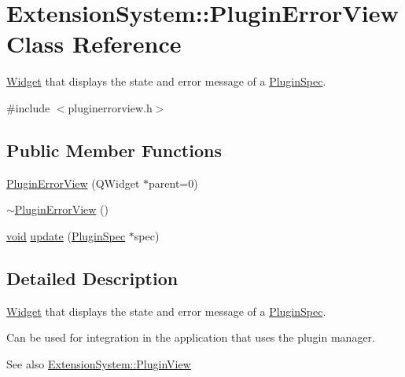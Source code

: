 \hypertarget{class_extension_system_1_1_plugin_error_view}{\section{\-Extension\-System\-:\-:\-Plugin\-Error\-View \-Class \-Reference}
\label{class_extension_system_1_1_plugin_error_view}
}


\hyperlink{class_widget}{\-Widget} that displays the state and error message of a \hyperlink{class_extension_system_1_1_plugin_spec}{\-Plugin\-Spec}.  




{\ttfamily \#include $<$pluginerrorview.\-h$>$}

\subsection*{\-Public \-Member \-Functions}
\begin{DoxyCompactItemize}
\item 
\hyperlink{class_extension_system_1_1_plugin_error_view_a8326b6848e7d40858281d7ded8f27b45}{\-Plugin\-Error\-View} (\-Q\-Widget $\ast$parent=0)
\item 
\hyperlink{class_extension_system_1_1_plugin_error_view_a5e358af244a8bde0b5589a5ffd45f2ef}{$\sim$\-Plugin\-Error\-View} ()
\item 
\hyperlink{group___u_a_v_objects_plugin_ga444cf2ff3f0ecbe028adce838d373f5c}{void} \hyperlink{class_extension_system_1_1_plugin_error_view_a327bd28795dc7c380440bc795e814efd}{update} (\hyperlink{class_extension_system_1_1_plugin_spec}{\-Plugin\-Spec} $\ast$spec)
\end{DoxyCompactItemize}


\subsection{\-Detailed \-Description}
\hyperlink{class_widget}{\-Widget} that displays the state and error message of a \hyperlink{class_extension_system_1_1_plugin_spec}{\-Plugin\-Spec}. 

\-Can be used for integration in the application that uses the plugin manager.

\begin{DoxySeeAlso}{\-See also}
\hyperlink{class_extension_system_1_1_plugin_view}{\-Extension\-System\-::\-Plugin\-View} 
\end{DoxySeeAlso}


